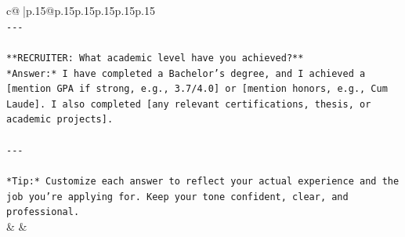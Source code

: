 \documentclass{article}
\begin{document}
{\begin{supertabular}{c@{$\;$}|p{.15\linewidth}@{}p{.15\linewidth}p{.15\linewidth}p{.15\linewidth}p{.15\linewidth}p{.15\linewidth}}
{{{\\ 
\texttt{{-}{-}{-}} \\
\\ 
\texttt{**RECRUITER: What academic level have you achieved?**  } \\
\texttt{*Answer:* I have completed a Bachelor’s degree, and I achieved a {[}mention GPA if strong, e.g., 3.7/4.0{]} or {[}mention honors, e.g., Cum Laude{]}. I also completed {[}any relevant certifications, thesis, or academic projects{]}.} \\
\\ 
\texttt{{-}{-}{-}} \\
\\ 
\texttt{*Tip:* Customize each answer to reflect your actual experience and the job you're applying for. Keep your tone confident, clear, and professional.} \\
            }
        }
    }
    & & \\ \\


\end{supertabular}}
\end{document}
